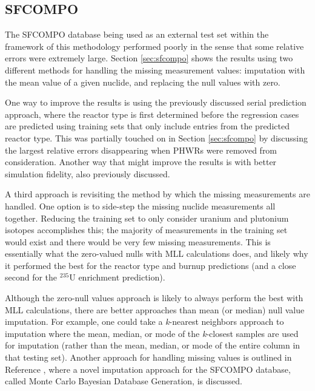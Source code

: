 \subsection{SFCOMPO}

The \gls{SFCOMPO} database being used as an external test set within the
framework of this methodology performed poorly in the sense that some relative
errors were extremely large.  Section \ref{sec:sfcompo} shows the results using
two different methods for handling the missing measurement values: imputation
with the mean value of a given nuclide, and replacing the null values with
zero. 

One way to improve the results is using the previously discussed serial
prediction approach, where the reactor type is first determined before the
regression cases are predicted using training sets that only include entries
from the predicted reactor type.  This was partially touched on in Section
\ref{sec:sfcompo} by discussing the largest relative errors disappearing when
\glspl{PHWR} were removed from consideration.  Another way that might improve
the results is with better simulation fidelity, also previously discussed. 

A third approach is revisiting the method by which the missing measurements are
handled.  One option is to side-step the missing nuclide measurements all
together.  Reducing the training set to only consider uranium and plutonium
isotopes accomplishes this; the majority of measurements in the training set
would exist and there would be very few missing measurements.  This is
essentially what the zero-valued nulls with \gls{MLL} calculations does, and
likely why it performed the best for the reactor type and burnup predictions
(and a close second for the ${}^{235}\text{U}$ enrichment prediction). 

Although the zero-null values approach is likely to always perform the best
with \gls{MLL} calculations, there are better approaches than mean (or median)
null value imputation. For example, one could take a \textit{k}-nearest
neighbors approach to imputation where the mean, median, or mode of the
\textit{k}-closest samples are used for imputation (rather than the mean,
median, or mode of the entire column in that testing set). Another approach for
handling missing values is outlined in Reference \cite{nf_missingdata}, where a
novel imputation approach for the \gls{SFCOMPO} database, called Monte Carlo
Bayesian Database Generation, is discussed.

